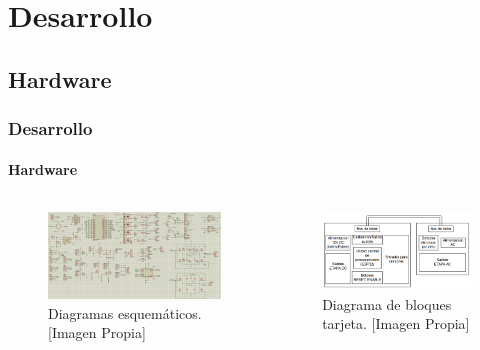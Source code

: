 \section{Desarrollo}

\subsection{Hardware}
\begin{frame}
\frametitle{Desarrollo}
\framesubtitle{Hardware}

\begin{columns}
	
\begin{figure}
	\centering
	\caption{Diagramas esquemáticos. [Imagen Propia]}
	\label{fig:esq}
	\includegraphics[width=\linewidth]{Imagenes/Proteus}
\end{figure}

\begin{figure}
	\caption{Diagrama de bloques tarjeta. [Imagen Propia]}
	\label{fig:prot}
	\includegraphics[width=\linewidth]{Imagenes/Tarjeta}
\end{figure}

\end{columns}
\end{frame}


